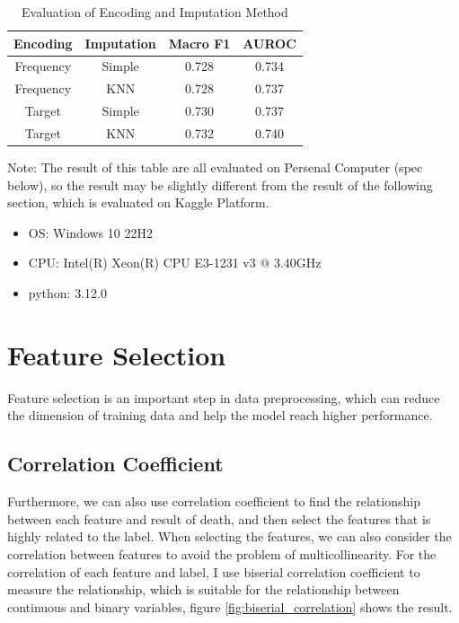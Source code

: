 \documentclass[a4paper, oneside, final, 12pt]{scrartcl} %
\begin{document}
\begin{table}[h]
  \centering
  \begin{tabular}{|c|c|c|c|}
    \hline
    Encoding & Imputation & Macro F1 & AUROC \\
    \hline
    Frequency & Simple & 0.728 & 0.734 \\
    \hline
    Frequency & KNN & 0.728 & 0.737 \\
    \hline
    Target & Simple & 0.730 & 0.737 \\
    \hline
    Target & KNN & 0.732 & 0.740 \\
    \hline
  \end{tabular}
  \caption{Evaluation of Encoding and Imputation Method}
  \label{tab:encoding_imputation}
\end{table}

Note: The result of this table are all evaluated on Persenal Computer (spec below),
so the result may be slightly different from the result of the following section,
which is evaluated on Kaggle Platform.

\begin{itemize}
  \item OS: Windows 10 22H2
  \item CPU: Intel(R) Xeon(R) CPU E3-1231 v3 @ 3.40GHz
  \item python: 3.12.0
\end{itemize}

\section{Feature Selection}

Feature selection is an important step in data preprocessing,
which can reduce the dimension of training data and help the model reach higher performance.

\subsection{Correlation Coefficient}

Furthermore, we can also use correlation coefficient to find the relationship between each
feature and result of death, and then select the features that is highly related to the label.
When selecting the features, we can also consider the correlation between features to avoid
the problem of multicollinearity.
For the correlation of each feature and label, I use biserial correlation coefficient to measure the relationship,
which is suitable for the relationship between continuous and binary variables, figure \ref{fig:biserial_correlation} shows the result.
\end{document}
